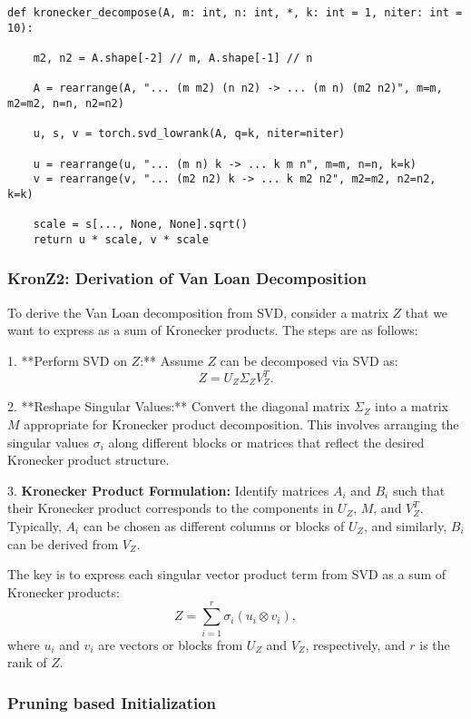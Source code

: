 \documentclass{article}
\begin{document}
{\begin{verbatim}
def kronecker_decompose(A, m: int, n: int, *, k: int = 1, niter: int = 10):

    m2, n2 = A.shape[-2] // m, A.shape[-1] // n
	
    A = rearrange(A, "... (m m2) (n n2) -> ... (m n) (m2 n2)", m=m, m2=m2, n=n, n2=n2)

    u, s, v = torch.svd_lowrank(A, q=k, niter=niter)

    u = rearrange(u, "... (m n) k -> ... k m n", m=m, n=n, k=k)
    v = rearrange(v, "... (m2 n2) k -> ... k m2 n2", m2=m2, n2=n2, k=k)

    scale = s[..., None, None].sqrt()
    return u * scale, v * scale
\end{verbatim}

\subsubsection{KronZ2: Derivation of Van Loan Decomposition}

To derive the Van Loan decomposition from SVD, consider a matrix \( Z \) that we want to express as a sum of Kronecker products. The steps are as follows:

1. **Perform SVD on \( Z \):**
   Assume \( Z \) can be decomposed via SVD as:
   \[
   Z = U_Z \Sigma_Z V_Z^T.
   \]

2. **Reshape Singular Values:**
   Convert the diagonal matrix \( \Sigma_Z \) into a matrix \( M \) appropriate for Kronecker product decomposition. This involves arranging the singular values \( \sigma_i \) along different blocks or matrices that reflect the desired Kronecker product structure.

   3. \textbf{Kronecker Product Formulation:}
   Identify matrices \( A_i \) and \( B_i \) such that their Kronecker product corresponds to the components in \( U_Z \), \( M \), and \( V_Z^T \). Typically, \( A_i \) can be chosen as different columns or blocks of \( U_Z \), and similarly, \( B_i \) can be derived from \( V_Z \).

   The key is to express each singular vector product term from SVD as a sum of Kronecker products:
   \[
   Z = \sum_{i=1}^r \sigma_i (u_i \otimes v_i),
   \]
   where \( u_i \) and \( v_i \) are vectors or blocks from \( U_Z \) and \( V_Z \), respectively, and \( r \) is the rank of \( Z \).





\subsubsection{Pruning based Initialization}%
\label{sub:Pruning based Initialization}


}
\end{document}
